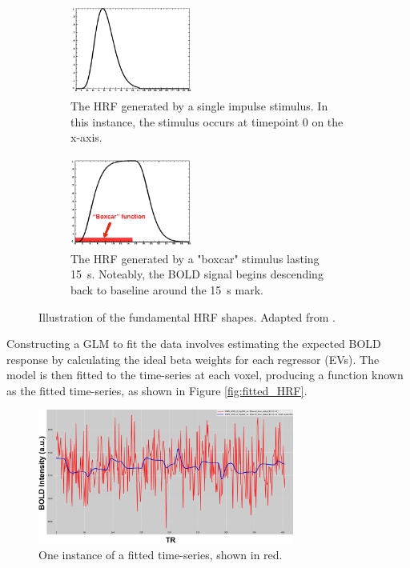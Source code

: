 \begin{figure}[htbp]
 	\centering
	\begin{subfigure}{0.49\textwidth}
		\centering
    		\includegraphics[width = 4cm, height = 3cm]{assets/images/single_HRF.jpg}
    		\caption{The \acrshort{HRF} generated by a single impulse stimulus. In this instance, the stimulus occurs at timepoint $ 0 $ on the x-axis.}
    		\label{fig:single_HRF}
	\end{subfigure}
	\hfill
	\begin{subfigure}{0.49\textwidth}
		\centering
   		\includegraphics[width = 4cm, height = 3cm]{assets/images/box_HRF.jpg}
   		\caption{The \acrshort{HRF} generated by a "boxcar" stimulus lasting \SI{15}{\second}. Noteably, the \gls{BOLD} signal begins descending back to baseline around the \SI{15}{\second} mark.}
   		\label{fig:box_HRF}
	\end{subfigure}
	\caption[Fundamental HRF Shapes]{Illustration of the fundamental \gls{HRF} shapes. Adapted from \cite{Andy_HRF}.}
 	\label{fig:HRFs}
\end{figure}

Constructing a \gls{GLM} to fit the data involves estimating the expected \gls{BOLD} response by calculating the ideal beta weights for each regressor (\gls{EV}s). The model is then fitted to the time-series at each voxel, producing a function known as the fitted time-series, as shown in Figure \autoref{fig:fitted_HRF}.

\begin{figure}[htbp]
    \centering
    \includegraphics[width = 0.75\textwidth]{assets/images/fitted_and_preproc.png}
    \caption[Fitted Time-Series]{One instance of a fitted time-series, shown in red.}
    \label{fig:fitted_TS}
\end{figure}

